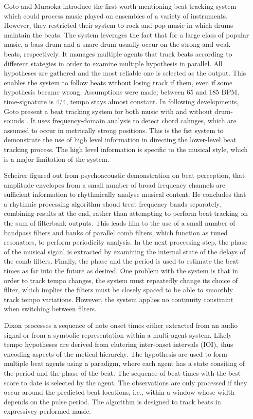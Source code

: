 \documentclass{scrartcl}
\begin{document}
Goto and Muraoka \cite{Goto1994} introduce the first worth mentioning beat tracking system which could process music played on ensembles of a variety of instruments. However, they restricted their system to rock and pop music in which drums maintain the beats. The system leverages the fact that for a large class of popular music, a bass drum and a snare drum usually occur on the strong and weak beats, respectively. It manages multiple agents that track beats according to different stategies in order to examine multiple hypothesis in parallel. All hypotheses are gathered and the most reliable one is selected as the output. This enables the system to follow beats without losing track if them, even if some hypothesis became wrong. Assumptions were made; between 65 and 185 BPM, time-signature is 4/4, tempo stays almost constant. In following developments, Goto present a beat tracking system for both music with and without drum-sounds \cite{Goto2001}. It uses frequency-domain analysis to detect chord cahnges, which are assumed to occur in metrically strong positions. This is the fist system to demonstrate the use of high level information in directing the lower-level beat tracking process. The high level information is specific to the musical style, which is a major limitation of the system.  

Scheirer \cite{Scheirer1998} figured out from psychoacoustic demonstration on beat perception, that amplitude envelopes from a small number of broad frequency channels are sufficient information to rhythmically analyse musical content. He concludes that a rhythmic processing algorithm shoud treat frequency bands separately, combining results at the end, rather than attempting to perform beat tracking on the sum of filterbank outputs. This leads him to the use of a small number of bandpass filters and banks of parallel comb filters, which function as tuned resonators, to perform periodicity analysis. In the next processing step, the phase of the musical siganl is extracted by examining the internal state of the delays of the comb filters. Finally, the phase and the period is used to estimate the beat times as far into the future as desired. One problem with the system is that in order to track tempo changes, the system must repeatedly change its choice of filter, which implies the filters must be closely spaced to be able to smoothly track tempo variations. However, the system applies no continuity constraint when switching between filters.  

Dixon \cite{Dixon2001} processes a sequence of note onset times either extracted from an audio signal or from a symbolic representation within a multi-agent system. Likely tempo hypotheses are derived from clutering inter-onset intervals (IOI), thus encoding aspects of the metical hierarchy. The hypothesis are used to form multiple beat agents using a paradigm, where each agent has a state consiting of the period and the phase of the beat. The sequence of beat times with the best score to date is selected by the agent. The observations are only processed if they occur around the predicted beat locations, i.e., within a window whose width depends on the pulse period. The algorithm is designed to track beats in expressivey performed music.
\end{document}
